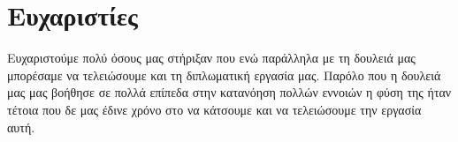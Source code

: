 \chapter*{Ευχαριστίες}

Ευχαριστούμε πολύ όσους μας στήριξαν που ενώ παράλληλα με τη δουλειά μας μπορέσαμε να τελειώσουμε και τη διπλωματική εργασία μας.
Παρόλο που η δουλειά μας μας βοήθησε σε πολλά επίπεδα στην κατανόηση πολλών εννοιών η φύση της ήταν τέτοια
που δε μας έδινε χρόνο στο να κάτσουμε και να τελειώσουμε την εργασία αυτή.